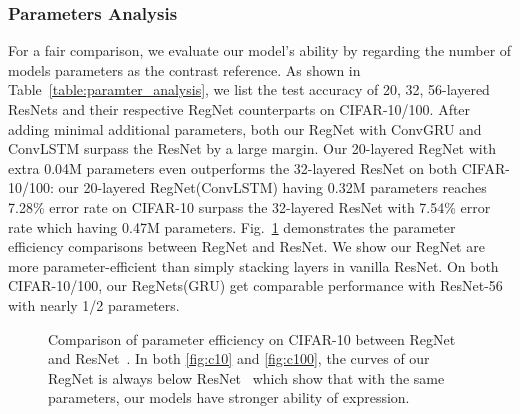 \documentclass[journal,comsoc]{IEEEtran}
\begin{document}
\subsubsection{Parameters Analysis}
For a fair comparison, we evaluate our model's ability by regarding the number of models parameters as the contrast reference. As shown in Table~\ref{table:paramter_analysis}, we list the test accuracy of 20, 32, 56-layered ResNets and their respective RegNet counterparts on CIFAR-10/100. After adding minimal additional parameters, both our RegNet with ConvGRU and ConvLSTM surpass the ResNet by a 
large margin. Our 20-layered RegNet with extra 0.04M parameters even outperforms the 32-layered ResNet on both CIFAR-10/100: our 20-layered RegNet(ConvLSTM) having 0.32M parameters reaches 7.28\% error rate on CIFAR-10 surpass the 32-layered ResNet with 7.54\% error rate which having 0.47M parameters. Fig.~\ref{fig:parameters_analysis} demonstrates the parameter efficiency comparisons between RegNet and ResNet. We show our RegNet are more parameter-efficient than simply stacking layers in vanilla ResNet. On both CIFAR-10/100, our RegNets(GRU) get comparable performance with ResNet-56 with nearly 1/2 parameters.






\begin{figure}[t] 
  \centering 
  \caption{Comparison of parameter efficiency on CIFAR-10 between RegNet and ResNet~\cite{DBLP:journals/corr/HeZRS15}. In both \ref{fig:c10} and \ref{fig:c100}, the curves of our RegNet is always below ResNet~\cite{DBLP:journals/corr/HeZRS15} which show that with the same parameters, our models have stronger ability of expression.
} 
\label{fig:parameters_analysis}
\end{figure}
\end{document}

